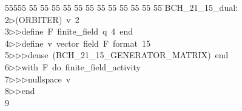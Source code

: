 %
%
\begin{tabbing}
55555 \= 55 \= 55 \= 55 \= 55 \= 55 \= 55 \= 55 \= 55 \= 55 \= 55 \= 55 \= 55 \= \>BCH\_21\_15\_dual:\\[0pt]
2\>$\triangleright$\>(ORBITER)\ v\ 2\ \\[0pt]
3\>$\triangleright$\>$\triangleright$\>define\ F\ finite\_field\ q\ 4\ end\ \\[0pt]
4\>$\triangleright$\>$\triangleright$\>define\ v\ vector\ field\ F\ format\ 15\ \\[0pt]
5\>$\triangleright$\>$\triangleright$\>$\triangleright$\>dense\ (BCH\_21\_15\_GENERATOR\_MATRIX)\ end\ \\[0pt]
6\>$\triangleright$\>$\triangleright$\>with\ F\ do\ finite\_field\_activity\ \\[0pt]
7\>$\triangleright$\>$\triangleright$\>$\triangleright$\>nullspace\ v\ \\[0pt]
8\>$\triangleright$\>$\triangleright$\>end\\[0pt]
9\>\end{tabbing}
